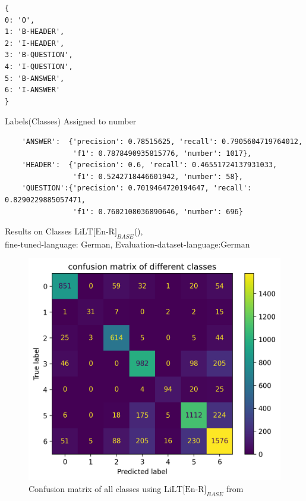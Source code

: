 \begin{listing}[!ht]

\begin{verbatim}
{
0: 'O', 
1: 'B-HEADER', 
2: 'I-HEADER', 
3: 'B-QUESTION', 
4: 'I-QUESTION', 
5: 'B-ANSWER', 
6: 'I-ANSWER'
}
\end{verbatim}
\caption{Labels(Classes) Assigned to number}
\label{multi_class}
\end{listing}


\begin{listing}[!ht]
\captionsetup{justification=centering}
\begin{verbatim}
    'ANSWER':  {'precision': 0.78515625, 'recall': 0.7905604719764012,
                'f1': 0.7878490935815776, 'number': 1017},
    'HEADER':  {'precision': 0.6, 'recall': 0.46551724137931033,
                'f1': 0.5242718446601942, 'number': 58},
    'QUESTION':{'precision': 0.7019464720194647, 'recall': 0.8290229885057471,
                'f1': 0.7602108036890646, 'number': 696}
\end{verbatim}
\caption{Results on Classes \(\text{LiLT[En-R]}_{BASE}\)(), \\ fine-tuned-language: German, Evaluation-dataset-language:German }
\label{Listing:main_Classes_res_30_epoch}
\end{listing}

\begin{figure}[!ht]
    \centering
    \includegraphics[width=0.6 \textwidth]{chapters/images/experiments_and_results/En_LiLT_30_output.png}
    \caption{Confusion matrix of all classes using \(\text{LiLT[En-R]}_{BASE}\) from  }
    \label{fig:multi_calss_en_lilt}
\end{figure}
    





